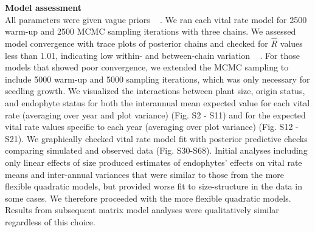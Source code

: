 \documentclass[lineno, sn-basic]{sn-jnl}%
\providecommand{\DIFadd}[1]{{\protect\color{blue}#1}} %
\providecommand{\DIFadd}[1]{{\protect\color{blue}\uwave{#1}}} %
\providecommand{\DIFaddbegin}{} %
\providecommand{\DIFaddend}{} %
\providecommand{\DIFdelend}{} %
\newcommand{\DIFaddincludegraphics}[2][]{{\color{blue}\fbox{\DIFOincludegraphics[#1]{#2}}}} %
\DeclareRobustCommand{\DIFaddbegin}{\DIFOaddbegin \let\includegraphics\DIFaddincludegraphics} %
\DeclareRobustCommand{\DIFaddend}{\DIFOaddend \let\includegraphics\DIFOincludegraphics} %
\DeclareRobustCommand{\DIFdelend}{\DIFOaddend \let\includegraphics\DIFOincludegraphics} %
\begin{document}
\DIFdelend \DIFaddbegin \textbf{\DIFadd{Model assessment}}\\
\DIFadd{All parameters were given vague priors \mbox{%
\citep{gabry2019visualization}}\hspace{0pt}%
.
We ran each vital rate model for 2500 warm-up and 2500 MCMC sampling iterations with three chains. 
We assessed model convergence with trace plots of posterior chains and checked for $\hat{R}$ values less than 1.01, indicating low within- and between-chain variation \mbox{%
\citep{brooks1998general,gelman2006data}}\hspace{0pt}%
. 
For those models that showed poor convergence, we extended the MCMC sampling to include 5000 warm-up and 5000 sampling iterations, which was only necessary for seedling growth.
We visualized the interactions between plant size, origin status, and endophyte status for both the interannual mean expected value for each vital rate (averaging over year and plot variance) (Fig. S2 - S11) and for the expected vital rate values specific to each year (averaging over plot variance) (Fig. S12 -S21).
We graphically checked vital rate model fit with posterior predictive checks comparing simulated and observed data (Fig. S30-S68).
Initial analyses including only linear effects of size produced estimates of endophytes' effects on vital rate means and inter-annual variances that were similar to those from the more flexible quadratic models, but provided worse fit to size-structure in the data in some cases. 
We therefore proceeded with the more flexible quadratic models. 
Results from subsequent matrix model analyses were qualitatively similar regardless of this choice.
}\DIFaddend 
\end{document}
